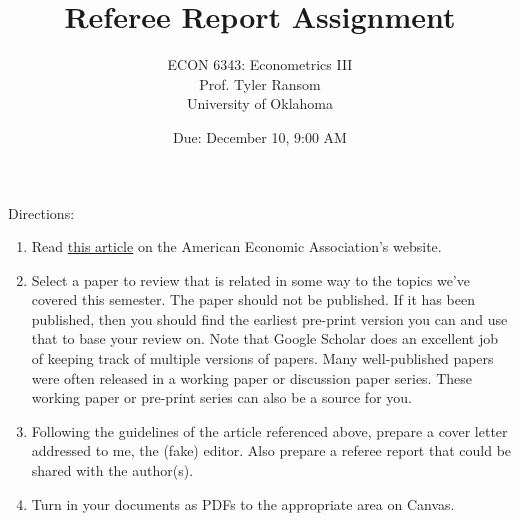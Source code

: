 \documentclass[12pt,english]{article}
\begin{document}
\title{Referee Report Assignment}
\author{ECON 6343: Econometrics III\\
Prof. Tyler Ransom\\
University of Oklahoma}
\date{Due: December 10, 9:00 AM}

\maketitle
Directions: 

\begin{enumerate}
    \item Read \href{https://www.aeaweb.org/content/file?id=222}{this article} on the American Economic Association's website. 
    \item Select a paper to review that is related in some way to the topics we've covered this semester. The paper should not be published. If it has been published, then you should find the earliest pre-print version you can and use that to base your review on. Note that Google Scholar does an excellent job of keeping track of multiple versions of papers. Many well-published papers were often released in a working paper or discussion paper series. These working paper or pre-print series can also be a source for you.
    \item Following the guidelines of the article referenced above, prepare a cover letter addressed to me, the (fake) editor. Also prepare a referee report that could be shared with the author(s).
    \item Turn in your documents as PDFs to the appropriate area on Canvas.
\end{enumerate}
\end{document}
